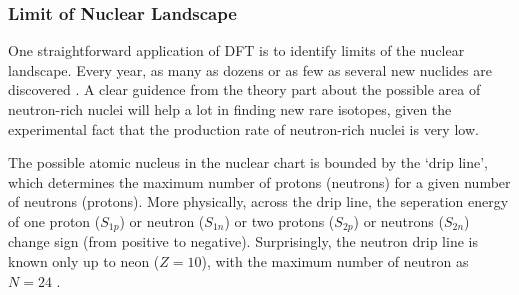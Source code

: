 \begin{comment}
Various EFT models are based on an effective interacting Lagragian, for example,
FSUGold model has the following effective Lagrangian \cite{PhysRevLett.95.122501}:
\begin{equation}
    \begin{aligned}
	\CL_{\text{int}} = &\bar{\psi} \left[ g_s\phi - \left( g_v V_\mu + \frac{g_\rho}{2}\vec{\tau}\cdot\vec{b}_\mu + \frac{e}{2}(1 + \tau_3) A_\mu \right)\gamma^\mu \right]\psi \\
	    & - \frac{\kappa}{3!}(g_s\phi)^3 - \frac{\lambda}{4!}(g_s\phi)^4 + \frac{\zeta}{4!}(g_v^2 V_\mu V^\mu )^2	\\
	    & + \Lambda_v(g_\rho^2\vec{b}_\mu\vec{b}^\mu)(g_v^2 V_\mu V^\mu)
    \end{aligned}
\end{equation}
This Lagrangian density descirbes interactions of the nucleon field $\psi$ to
various meson fields and their self-interctions. $\phi$ is a scalar.

The difference between different EFT models is just how many coupling they
include in their effetive Lagrangian density. With the Lagrangian density,
one can calculate the properties of various nuclei, fitting predicted values
to experimental results to get a parameter set for the coupling constant in
the Lagrangian, which is called one model. Frequently used EFT models include
NL3 \cite{}, FSUGold \cite{} and 
\end{comment}

\subsubsection{Limit of Nuclear Landscape}
One straightforward application of DFT is to identify limits of the nuclear
landscape. Every year, as many as dozens or as few as several new nuclides
are discovered \cite{NEW_NULCIDES}. A clear guidence from the theory part
about the possible area of neutron-rich nuclei will help a lot in finding 
new rare isotopes, given the experimental fact that the production rate of 
neutron-rich nuclei is very low.

The possible atomic nucleus in the nuclear chart is bounded by the 
`drip line', which determines the maximum number of protons (neutrons) for a 
given number of neutrons (protons). More physically, across the drip line, the
seperation energy of one proton ($S_{1p}$) or neutron ($S_{1n}$) 
or two protons ($S_{2p}$) or neutrons ($S_{2n}$) change sign (from positive to negative).
Surprisingly, the neutron drip line is known only up to neon ($Z=10$), with the 
maximum number of neutron as $N=24$ \cite{PhysRevLett.123.212501}. 

